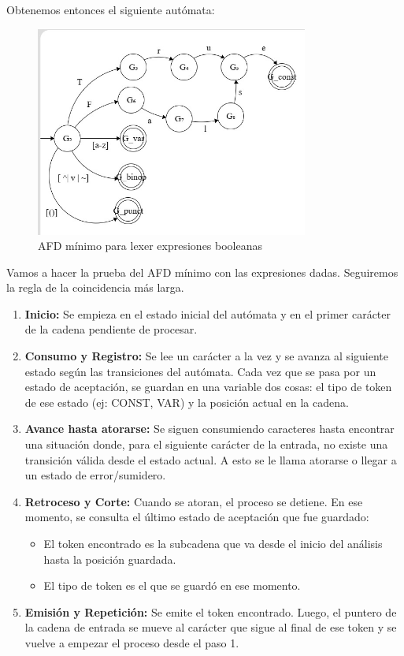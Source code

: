 Obtenemos entonces el siguiente autómata:

\begin{figure}[h!]
    \centering
    \includegraphics[width=0.8\textwidth]{images/ej10-3.jpeg}
    \caption{AFD mínimo para lexer expresiones booleanas}
    \label{fig:my_label}
\end{figure}


Vamos a hacer la prueba del AFD mínimo con las expresiones dadas. Seguiremos la regla de la coincidencia más larga.

\begin{enumerate}
    \item \textbf{Inicio:} Se empieza en el estado inicial del autómata y en el primer carácter de la cadena pendiente de procesar.

    \item \textbf{Consumo y Registro:} Se lee un carácter a la vez y se avanza al siguiente estado según las transiciones del autómata. Cada vez que se pasa por un estado de aceptación, se guardan en una variable dos cosas: el tipo de token de ese estado (ej: CONST, VAR) y la posición actual en la cadena.

    \item \textbf{Avance hasta atorarse:} Se siguen consumiendo caracteres hasta encontrar una situación donde, para el siguiente carácter de la entrada, no existe una transición válida desde el estado actual. A esto se le llama atorarse o llegar a un estado de error/sumidero.

    \item \textbf{Retroceso y Corte:} Cuando se atoran, el proceso se detiene. En ese momento, se consulta el último estado de aceptación que fue guardado:
    \begin{itemize}
        \item El token encontrado es la subcadena que va desde el inicio del análisis hasta la posición guardada.
        \item El tipo de token es el que se guardó en ese momento.
    \end{itemize}

    \item \textbf{Emisión y Repetición:} Se emite el token encontrado. Luego, el puntero de la cadena de entrada se mueve al carácter que sigue al final de ese token y se vuelve a empezar el proceso desde el paso 1.
\end{enumerate}



